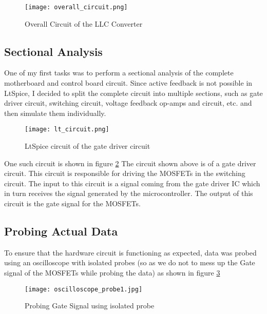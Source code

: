 \begin{figure}[H]
    \centering
    \texttt{[image: overall\_circuit.png]}
    \caption{Overall Circuit of the LLC Converter}
    \label{fig:Simulation1}
\end{figure}

\subsection{Sectional Analysis}
One of my first tasks was to perform a sectional analysis of the complete motherboard and control board circuit.
\noindent
Since active feedback is not possible in LtSpice, I decided to split the complete circuit into multiple sections, such as gate driver circuit, switching circuit, voltage feedback op-amps and circuit, etc. and then simulate them individually.\\
\begin{figure}[H]
    \centering
    \texttt{[image: lt\_circuit.png]}
    \caption{LtSpice circuit of the gate driver circuit}
    \label{fig:lt_circuit}
\end{figure}

\noindent
One such circuit is shown in figure \ref*{fig:lt_circuit}
\noindent
The circuit shown above is of a gate driver circuit. This circuit is responsible for driving the MOSFETs in the switching circuit. The input to this circuit is a signal coming from the gate driver IC which in turn receives the signal generated by the microcontroller. The output of this circuit is the gate signal for the MOSFETs.\\

\subsection{Probing Actual Data}
To ensure that the hardware circuit is functioning as expected, data was probed using an oscilloscope with isolated probes (so as we do not to mess up the Gate signal of the MOSFETs while probing the data) as shown in figure \ref*{fig:oscilloscope_probe}
\begin{figure}[H]
    \centering
    \texttt{[image: oscilloscope\_probe1.jpg]}
    \caption{Probing Gate Signal using isolated probe}
    \label{fig:oscilloscope_probe}
\end{figure}

